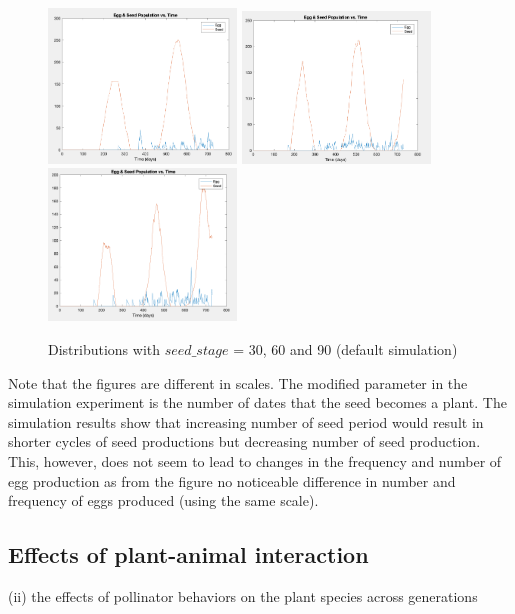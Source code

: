 \documentclass[3p,,preprint,12pt]{elsarticle}
\begin{document}
    \begin{figure}[!htb]
    \begin{center}
    \includegraphics[width=50mm]{figures/s2_6.png} 
    \includegraphics[width=50mm]{figures/s2_1.png} 
    \includegraphics[width=50mm]{figures/s2_7.png} 
    \caption{Distributions with $seed\_stage$ = 30, 60 and 90 (default simulation)}
    \end{center}
    \end{figure}

Note that the figures are different in scales. The modified parameter in the simulation experiment is the number of dates that the seed becomes a plant. The simulation results show that increasing number of seed period would result in shorter cycles of seed productions but decreasing number of seed production. This, however, does not seem to lead to changes in the frequency and number of egg production as from the figure no noticeable difference in number and frequency of eggs produced (using the same scale).
    
\subsection{Effects of plant-animal interaction}
(ii) the effects of pollinator behaviors on the plant species across generations
\end{document}
